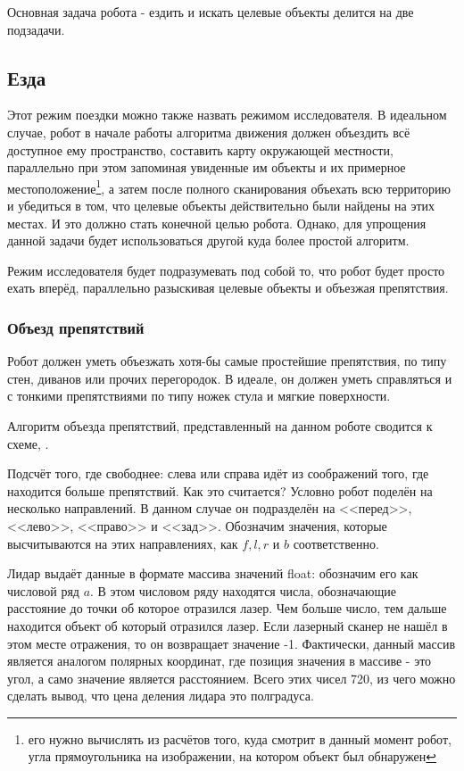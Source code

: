 Основная задача робота - ездить и искать целевые объекты делится на две подзадачи.

\subsection{Езда}

Этот режим поездки можно также назвать режимом исследователя. В идеальном случае, робот в начале работы алгоритма движения должен объездить всё доступное ему пространство, составить карту окружающей местности, параллельно при этом запоминая увиденные им объекты и их примерное местоположение\footnote{его нужно вычислять из расчётов того, куда смотрит в данный момент робот, угла прямоугольника на изображении, на котором объект был обнаружен}, а затем после полного сканирования объехать всю территорию и убедиться в том, что целевые объекты действительно были найдены на этих местах. И это должно стать конечной целью робота. Однако, для упрощения данной задачи будет использоваться другой куда более простой алгоритм. 

Режим исследователя будет подразумевать под собой то, что робот будет просто ехать вперёд, параллельно разыскивая целевые объекты и объезжая препятствия. 

\subsubsection{Объезд препятствий}

Робот должен уметь объезжать хотя-бы самые простейшие препятствия, по типу стен, диванов или прочих перегородок. В идеале, он должен уметь справляться и с тонкими препятствиями по типу ножек стула и мягкие поверхности.

Алгоритм объезда препятствий, представленный на данном роботе сводится к схеме, .

Подсчёт того, где свободнее: слева или справа идёт из соображений того, где находится больше препятствий. Как это считается? Условно робот поделён на несколько направлений. В данном случае он подразделён на <<перед>>, <<лево>>, <<право>> и <<зад>>. Обозначим значения, которые высчитываются на этих направлениях, как $f, l, r$ и $b$ соответственно. 

Лидар выдаёт данные в формате массива значений float: обозначим его как числовой ряд $a$. В этом числовом ряду находятся числа, обозначающие расстояние до точки об которое отразился лазер. Чем больше число, тем дальше находится объект об который отразился лазер. Если лазерный сканер не нашёл в этом месте отражения, то он возвращает значение -1. Фактически, данный массив является аналогом полярных координат, где позиция значения в массиве - это угол, а само значение является расстоянием. Всего этих чисел 720, из чего можно сделать вывод, что цена деления лидара это полградуса. 


